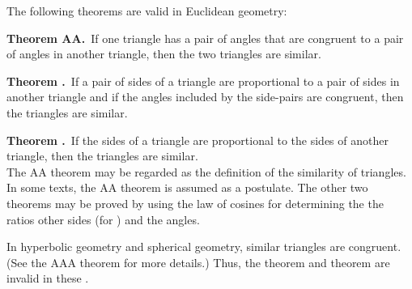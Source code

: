 \documentclass[12pt]{article}
\theoremstyle{definition}
\begin{document}
The following theorems are valid in Euclidean geometry:

\textbf{Theorem AA.}\, If one triangle has a pair of angles that are congruent to a pair of angles in another triangle, then the two triangles are similar.

\textbf{Theorem .}\, If a pair of sides of a triangle are proportional to a pair of sides in another triangle and if the angles included by the side-pairs are congruent, then the triangles are similar.

\textbf{Theorem .}\, If the sides of a triangle are proportional to the sides of another triangle, then the triangles are similar.\\

The AA theorem may be regarded as the definition of the similarity of triangles.  In some texts, the AA theorem is assumed as a postulate.  The other two theorems may be proved by using the law of cosines for determining the the ratios other sides (for ) and the angles.

In hyperbolic geometry and spherical geometry, similar triangles are congruent.  (See the AAA theorem for more details.)  Thus, the  theorem and  theorem are invalid in these .
\end{document}
